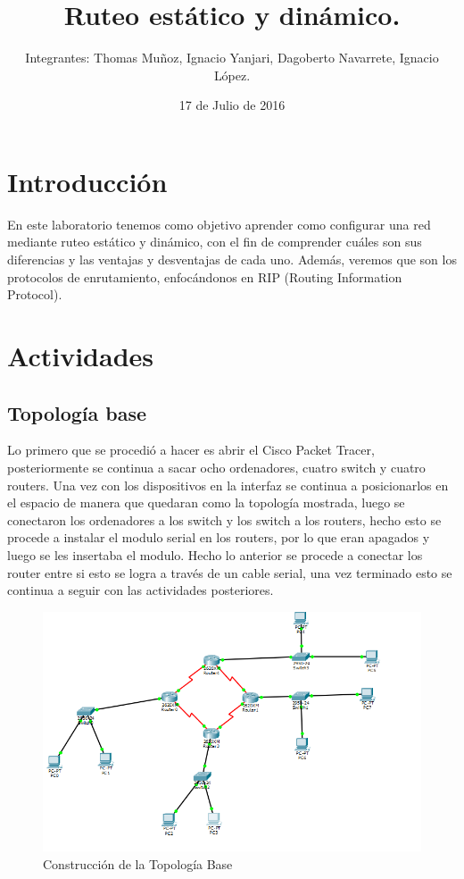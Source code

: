 \documentclass{udpreport}
\title{Ruteo estático y dinámico. }
\author{Integrantes: Thomas Muñoz, Ignacio Yanjari, Dagoberto Navarrete, Ignacio López.}
\date{17 de Julio de 2016}
\begin{document}
\maketitle
\tableofcontents
\listoffigures
\chapter{Introducción}
  En este laboratorio tenemos como objetivo aprender como configurar una red  mediante ruteo estático y dinámico, con el fin de
  comprender cuáles son sus diferencias y las ventajas y desventajas de cada uno. Además, veremos que son los protocolos de
  enrutamiento, enfocándonos en RIP (Routing Information Protocol).\\
\chapter{Actividades}
	\section{Topología base}
	Lo primero que se procedió a hacer es abrir el Cisco Packet Tracer, posteriormente se continua a sacar ocho ordenadores,
	cuatro switch y cuatro routers. Una vez con los dispositivos en la interfaz se continua a posicionarlos en el espacio de
	manera que quedaran como la topología mostrada, luego se conectaron los ordenadores a los switch y los switch a los
	routers, hecho esto se procede a instalar el modulo serial en los routers, por lo que eran apagados y luego se les insertaba
	el modulo. Hecho lo anterior se procede a conectar los router entre si esto se logra a través de un cable serial, una vez
	terminado esto se continua a seguir con las actividades posteriores.\\
	\begin{figure}[H]
	\centering
	\includegraphics[width=\textwidth]{Topologia_base.PNG}
	\caption{Construcción de la Topología Base}
	\end{figure}
	\newpage
\end{document}
